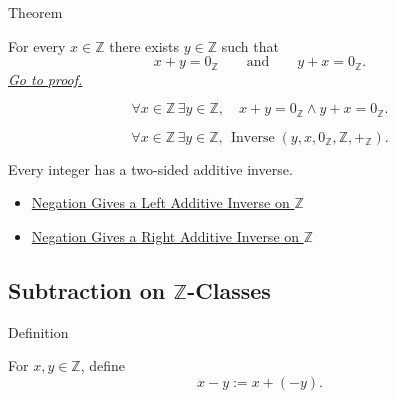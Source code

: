 \begin{theorembox}{Theorem}
\begin{theorem}
\label{thm:every-integer-has-additive-inverse}
For every $x\in\mathbb{Z}$ there exists $y\in\mathbb{Z}$ such that
\[
x+y=0_{\mathbb{Z}}
\qquad\text{and}\qquad
y+x=0_{\mathbb{Z}}.
\]
\hyperref[prf:every-integer-has-additive-inverse]{\textit{Go to proof.}}
\end{theorem}
\end{theorembox}

\begin{remark*}
\[
\forall x\in\mathbb{Z}\,\exists y\in\mathbb{Z},\quad
x+y=0_{\mathbb{Z}}\land y+x=0_{\mathbb{Z}}.
\]
\end{remark*}

\begin{remark*}
\[
\forall x\in\mathbb{Z}\,\exists y\in\mathbb{Z},\,
\operatorname{Inverse}(y,x,0_{\mathbb{Z}},\mathbb{Z},+_{\mathbb{Z}}).
\]
\end{remark*}

\begin{remark*}[Interpretation]
Every integer has a two-sided additive inverse.
\end{remark*}

\begin{dependencies}
\begin{itemize}
  \item \hyperref[thm:negation-left-additive-inverse-on-z]{Negation Gives a Left Additive Inverse on $\mathbb{Z}$}
  \item \hyperref[cor:negation-right-additive-inverse-on-z]{Negation Gives a Right Additive Inverse on $\mathbb{Z}$}
\end{itemize}
\end{dependencies}

\subsection*{\texorpdfstring{Subtraction on $\mathbb{Z}$-Classes}{Subtraction on Z-Classes}}

\begin{definitionbox}{Definition}
\begin{definition}
\label{def:subtraction-on-z}
For $x,y\in\mathbb{Z}$, define
\[
x-y:=x+(-y).
\]
\end{definition}
\end{definitionbox}

